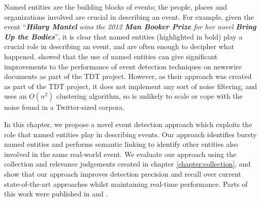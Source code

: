 
Named entities are the building blocks of events; the people, places and organizations involved are crucial in describing an event. For example, given the event ``\textit{\textbf{Hilary Mantel} wins the 2012 \textbf{Man Booker Prize} for her novel \textbf{Bring Up the Bodies}}'', it is clear that named entities (highlighted in bold) play a crucial role in describing an event, and are often enough to decipher what happened. \cite{Kumaran:2004:TCN:1008992.1009044, Kumaran2005} showed that the use of named entities can give significant improvements to the performance of event detection techniques on newswire documents as part of the TDT project.
However, as their approach was created as part of the TDT project, it does not implement any sort of noise filtering, and uses an $O(n^2)$ clustering algorithm,  so is unlikely to scale or cope with the noise found in a Twitter-sized corpora.

In this chapter, we propose a novel event detection approach which exploits the role that named entities play in describing events.
Our approach identifies bursty named entities and performs semantic linking to identify other entities also involved in the same real-world event.
We evaluate our approach using the collection and relevance judgements created in chapter \ref{chapter:collection}, and show that our approach improves detection precision and recall over current state-of-the-art approaches whilst maintaining real-time performance.
Parts of this work were published in \cite{McMinn15} and \cite{McMinn14}.